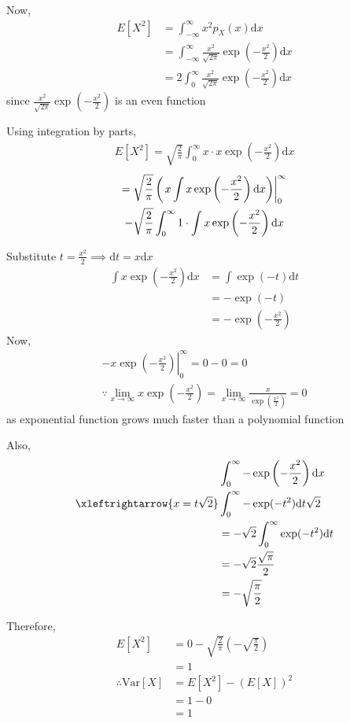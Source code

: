 \documentclass[journal,12pt,twocolumn]{IEEEtran}
\providecommand{\brak}[1]{\ensuremath{\left(#1\right)}}
\providecommand{\mean}[1]{E\left[ #1 \right]}
\providecommand{\var}[1]{\mathrm{Var}\left[ #1 \right]}
\providecommand{\der}[1]{\mathrm{d} #1}
\numberwithin{equation}{section}
\renewcommand\thesection{\arabic{section}}
\begin{document}
\begin{enumerate}[label=\thesection.\arabic*,ref=\thesection.\theenumi]
	Now, 
	\begin{align}
		\mean{X^2} &= \int_{-\infty}^{\infty} x^2 p_{X}(x) \mathrm{d}x \\
		&= \int_{-\infty}^{\infty} \frac{x^2}{\sqrt{2\pi}}\exp\brak{-\frac{x^2}{2}} \mathrm{d}x \\
		&= 2 \int_{0}^{\infty} \frac{x^2}{\sqrt{2\pi}}\exp\brak{-\frac{x^2}{2}} \mathrm{d}x
	\end{align}
	since $\frac{x^2}{\sqrt{2\pi}}\exp\brak{-\frac{x^2}{2}}$ is an even function
	
	Using integration by parts,
	\begin{align}
		\mean{X^2} = \sqrt{\frac{2}{\pi}}  \int_{0}^{\infty} x \cdot x \exp\brak{-\frac{x^2}{2}} \der{x} 
	\end{align}
	\begin{multline}
		= \sqrt{\frac{2}{\pi}} \brak{\left. x \int x \exp\brak{-\frac{x^2}{2}} \der{x}}\right|_0^{\infty} \\- \sqrt{\frac{2}{\pi}}  \int_{0}^{\infty} 1 \cdot \int x \exp\brak{-\frac{x^2}{2}} \der{x}
	\end{multline}
	
	Substitute $t = \frac{x^2}{2} \implies \der{t} = x\der{x}$
	\begin{align}
		\int x \exp\brak{-\frac{x^2}{2}} \der{x} &= \int \exp(-t) \der{t} \\
		&= - \exp(-t) \\
		&= - \exp\brak{-\frac{x^2}{2}}
	\end{align}
	Now,
	\begin{align}
		\left. -x \exp\brak{-\frac{x^2}{2}} \right|_0^{\infty} = 0 - 0 = 0 \\
		\because \lim_{x\to\infty} x \exp\brak{-\frac{x^2}{2}} = \lim_{x\to\infty} \frac{x}{\exp\brak{\frac{x^2}{2}}} =0
	\end{align}
	as exponential function grows much faster than a polynomial function
	
	Also, 
	\begin{align}
		&\int_0^{\infty} - \exp\brak{-\frac{x^2}{2}} \der{x} \\
		\xleftrightarrow{x = t\sqrt{2}} &\int_0^{\infty} -\exp(-t^2) \der{t}\sqrt{2} \\
		&= -{\sqrt{2}} \int_0^{\infty} \exp(-t^2) \der{t} \\
		&= -{\sqrt{2}} \frac{\sqrt{\pi}}{2} \\
		&= - \sqrt{\frac{\pi}{2}}
	\end{align}
	
	Therefore,
	\begin{align}
		\mean{X^2} &= 0 - \sqrt{\frac{2}{\pi}} \brak{- \sqrt{\frac{\pi}{2}}} \\
		&= 1 \\
		\therefore \var{X} &= \mean{X^2} - \brak{\mean{X}}^2 \\
		&= 1 - 0 \\
		&= 1
	\end{align}
	\end{enumerate}
	
\end{document}
